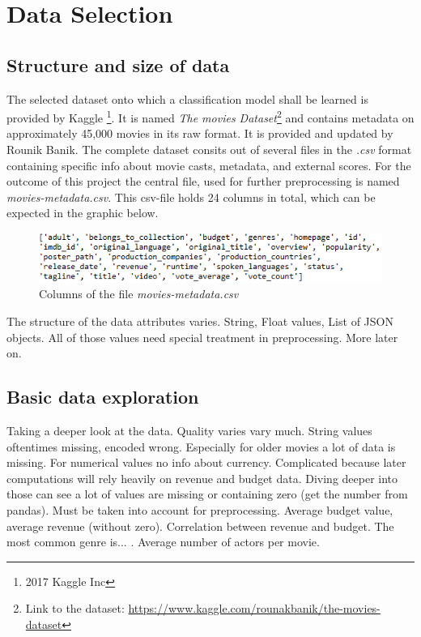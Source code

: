 \chapter{Data Selection}
\label{cha:data_selection}

\section{Structure and size of data}
The selected dataset onto which a classification model shall be learned is provided by Kaggle \footnote{2017 Kaggle Inc}. It is named \textit{The movies Dataset}\footnote{Link to the dataset: \hyperref[https://www.kaggle.com/rounakbanik/the-movies-dataset]{https://www.kaggle.com/rounakbanik/the-movies-dataset}} and contains metadata on approximately 45,000 movies in its raw format. It is provided and updated by Rounik Banik. The complete dataset consits out of several files in the \textit{.csv} format containing specific info about movie casts, metadata, and external scores. For the outcome of this project the central file, used for further preprocessing is named \textit{movies-metadata.csv}. This csv-file holds 24 columns in total, which can be expected in the graphic below.
\begin{figure}[ht]
	\centering
		\includegraphics[width=\textwidth]{images/Raw_dataset_headers.png}
	\caption{Columns of the file \textit{movies-metadata.csv}}
\end{figure}


The structure of the data attributes varies. String, Float values, List of JSON objects. All of those values need special treatment in preprocessing. More later on.


\section{Basic data exploration}
Taking a deeper look at the data. Quality varies vary much. String values oftentimes missing, encoded wrong. Especially for older movies a lot of data is missing. For numerical values no info about currency. Complicated because later computations will rely heavily on revenue and budget data. Diving deeper into those can see a lot of values are missing or containing zero (get the number from pandas). Must be taken into account for preprocessing. Average budget value, average revenue (without zero). Correlation between revenue and budget. The most common genre is... . Average number of actors per movie.

